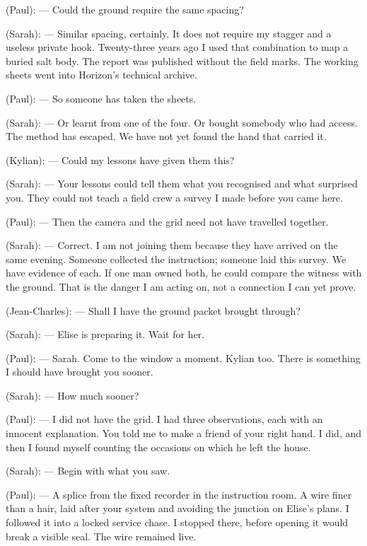 \begin{room}
(Paul): --- Could the ground require the same spacing?

(Sarah): --- Similar spacing, certainly. It does not require my stagger and a useless private hook. Twenty-three years ago I used that combination to map a buried salt body. The report was published without the field marks. The working sheets went into Horizon's technical archive.

(Paul): --- So someone has taken the sheets.

(Sarah): --- Or learnt from one of the four. Or bought somebody who had access. The method has escaped. We have not yet found the hand that carried it.

(Kylian): --- Could my lessons have given them this?

(Sarah): --- Your lessons could tell them what you recognised and what surprised you. They could not teach a field crew a survey I made before you came here.

(Paul): --- Then the camera and the grid need not have travelled together.

(Sarah): --- Correct. I am not joining them because they have arrived on the same evening. Someone collected the instruction; someone laid this survey. We have evidence of each. If one man owned both, he could compare the witness with the ground. That is the danger I am acting on, not a connection I can yet prove.

(Jean-Charles): --- Shall I have the ground packet brought through?

(Sarah): --- Elise is preparing it. Wait for her.

\centerline{}

(Paul): --- Sarah. Come to the window a moment. Kylian too. There is something I should have brought you sooner.

(Sarah): --- How much sooner?

(Paul): --- I did not have the grid. I had three observations, each with an innocent explanation. You told me to make a friend of your right hand. I did, and then I found myself counting the occasions on which he left the house.

(Sarah): --- Begin with what you saw.

(Paul): --- A splice from the fixed recorder in the instruction room. A wire finer than a hair, laid after your system and avoiding the junction on Elise's plans. I followed it into a locked service chase. I stopped there, before opening it would break a visible seal. The wire remained live.


\end{room}
